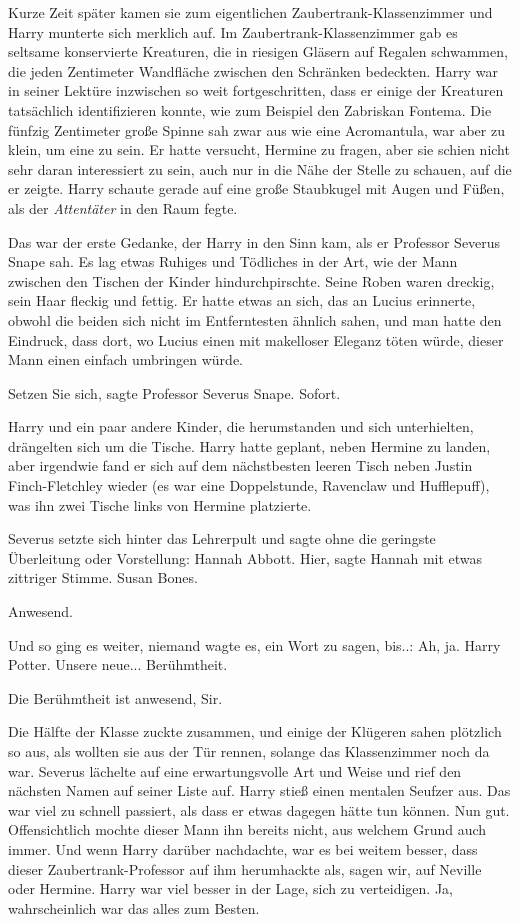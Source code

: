 Kurze Zeit später kamen sie zum eigentlichen Zaubertrank-Klassenzimmer und Harry
munterte sich merklich auf. Im Zaubertrank-Klassenzimmer gab es seltsame
konservierte Kreaturen, die in riesigen Gläsern auf Regalen schwammen, die jeden
Zentimeter Wandfläche zwischen den Schränken bedeckten. Harry war in seiner
Lektüre inzwischen so weit fortgeschritten, dass er einige der Kreaturen
tatsächlich identifizieren konnte, wie zum Beispiel den Zabriskan Fontema. Die
fünfzig Zentimeter große Spinne sah zwar aus wie eine Acromantula, war aber zu
klein, um eine zu sein. Er hatte versucht, Hermine zu fragen, aber sie schien
nicht sehr daran interessiert zu sein, auch nur in die Nähe der Stelle zu
schauen, auf die er zeigte. Harry schaute gerade auf eine große Staubkugel mit
Augen und Füßen, als der \emph{Attentäter} in den Raum fegte.

Das war der erste Gedanke, der Harry in den Sinn kam, als er Professor Severus
Snape sah. Es lag etwas Ruhiges und Tödliches in der Art, wie der Mann zwischen
den Tischen der Kinder hindurchpirschte. Seine Roben waren dreckig, sein Haar
fleckig und fettig. Er hatte etwas an sich, das an Lucius erinnerte, obwohl die
beiden sich nicht im Entferntesten ähnlich sahen, und man hatte den Eindruck,
dass dort, wo Lucius einen mit makelloser Eleganz töten würde, dieser Mann einen
einfach umbringen würde.

\glqq{}Setzen Sie sich\grqq{}, sagte Professor Severus Snape. \glqq{}
Sofort.\grqq{}

Harry und ein paar andere Kinder, die herumstanden und sich unterhielten,
drängelten sich um die Tische. Harry hatte geplant, neben Hermine zu landen,
aber irgendwie fand er sich auf dem nächstbesten leeren Tisch neben Justin
Finch-Fletchley wieder (es war eine Doppelstunde, Ravenclaw und Hufflepuff), was
ihn zwei Tische links von Hermine platzierte.

Severus setzte sich hinter das Lehrerpult und sagte ohne die geringste
Überleitung oder Vorstellung: \glqq{}Hannah Abbott.\grqq{} \glqq{}Hier\grqq{},
sagte Hannah mit etwas zittriger Stimme. \glqq{}Susan Bones.\grqq{}

\glqq{}Anwesend.\grqq{}

Und so ging es weiter, niemand wagte es, ein Wort zu sagen, bis..: \glqq{}Ah, ja.
Harry Potter. Unsere neue... Berühmtheit.\grqq{}

\glqq{}Die Berühmtheit ist anwesend, Sir.\grqq{}

Die Hälfte der Klasse zuckte zusammen, und einige der Klügeren sahen plötzlich
so aus, als wollten sie aus der Tür rennen, solange das Klassenzimmer noch da
war. Severus lächelte auf eine erwartungsvolle Art und Weise und rief den
nächsten Namen auf seiner Liste auf. Harry stieß einen mentalen Seufzer aus. Das
war viel zu schnell passiert, als dass er etwas dagegen hätte tun können. Nun
gut. Offensichtlich mochte dieser Mann ihn bereits nicht, aus welchem Grund auch
immer. Und wenn Harry darüber nachdachte, war es bei weitem besser, dass dieser
Zaubertrank-Professor auf ihm herumhackte als, sagen wir, auf Neville oder
Hermine. Harry war viel besser in der Lage, sich zu verteidigen. Ja,
wahrscheinlich war das alles zum Besten.

